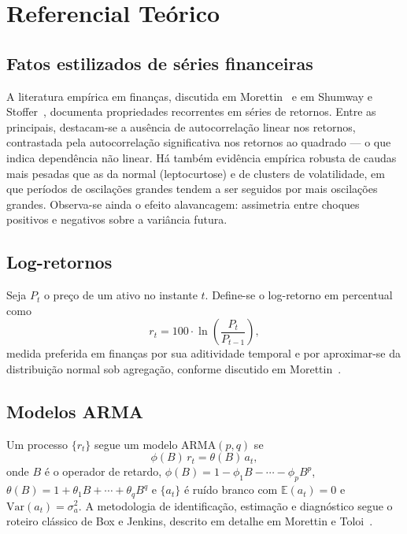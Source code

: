 \documentclass[12pt, a4paper]{article}
\begin{document}
\section{Referencial Teórico}
\label{sec:teoria}

\subsection{Fatos estilizados de séries financeiras}

A literatura empírica em finanças, discutida em Morettin~\cite{morettin2017} e em Shumway e Stoffer~\cite{shumway2017}, documenta propriedades recorrentes em séries de retornos. Entre as principais, destacam-se a ausência de autocorrelação linear nos retornos, contrastada pela autocorrelação significativa nos retornos ao quadrado --- o que indica dependência não linear. Há também evidência empírica robusta de caudas mais pesadas que as da normal (leptocurtose) e de clusters de volatilidade, em que períodos de oscilações grandes tendem a ser seguidos por mais oscilações grandes. Observa-se ainda o efeito alavancagem: assimetria entre choques positivos e negativos sobre a variância futura.

\subsection{Log-retornos}

Seja $P_t$ o preço de um ativo no instante $t$. Define-se o log-retorno em percentual como
\begin{equation}
    r_t = 100 \cdot \ln\!\left(\frac{P_t}{P_{t-1}}\right),
\end{equation}
medida preferida em finanças por sua aditividade temporal e por aproximar-se da distribuição normal sob agregação, conforme discutido em Morettin~\cite{morettin2017}.

\subsection{Modelos ARMA}

Um processo $\{r_t\}$ segue um modelo ARMA$(p,q)$ se
\begin{equation}
    \phi(B)\,r_t = \theta(B)\,a_t,
\end{equation}
onde $B$ é o operador de retardo, $\phi(B) = 1 - \phi_1 B - \cdots - \phi_p B^p$, $\theta(B) = 1 + \theta_1 B + \cdots + \theta_q B^q$ e $\{a_t\}$ é ruído branco com $\mathbb{E}(a_t) = 0$ e $\mathrm{Var}(a_t) = \sigma_a^2$. A metodologia de identificação, estimação e diagnóstico segue o roteiro clássico de Box e Jenkins, descrito em detalhe em Morettin e Toloi~\cite{morettin2018}.
\end{document}
